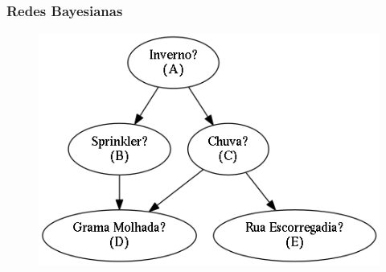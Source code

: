 \documentclass[10pt]{beamer}
\theoremstyle{plain}
\begin{document}
\begingroup
\tiny
\begin{frame}
  \frametitle{Redes Bayesianas}
  \begin{figure}[h]
    \centering\includegraphics[scale=0.25]{imgs/bn.png}
  \end{figure}


\end{frame}
\end{document}
